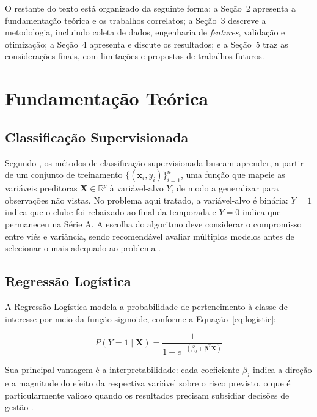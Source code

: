 \documentclass[
    article,
    12pt,
    oneside,
    a4paper,
    english,
    brazilian
    ]{abntex2}
\begin{document}
O restante do texto está organizado da seguinte forma: a Seção~2 apresenta a fundamentação teórica e os trabalhos correlatos; a Seção~3 descreve a metodologia, incluindo coleta de dados, engenharia de \textit{features}, validação e otimização; a Seção~4 apresenta e discute os resultados; e a Seção~5 traz as considerações finais, com limitações e propostas de trabalhos futuros.

\section{Fundamentação Teórica}

\subsection{Classificação Supervisionada}

Segundo , os métodos de classificação supervisionada buscam aprender, a partir de um conjunto de treinamento $\{(\mathbf{x}_i, y_i)\}_{i=1}^n$, uma função que mapeie as variáveis preditoras $\mathbf{X} \in \mathbb{R}^p$ à variável-alvo $Y$, de modo a generalizar para observações não vistas. No problema aqui tratado, a variável-alvo é binária: $Y = 1$ indica que o clube foi rebaixado ao final da temporada e $Y = 0$ indica que permaneceu na Série A. A escolha do algoritmo deve considerar o compromisso entre viés e variância, sendo recomendável avaliar múltiplos modelos antes de selecionar o mais adequado ao problema \cite{james2023}.

\subsection{Regressão Logística}

A Regressão Logística \cite{cox1958} modela a probabilidade de pertencimento à classe de interesse por meio da função sigmoide, conforme a Equação~\ref{eq:logistic}:

\begin{equation}
    P(Y = 1 \mid \mathbf{X}) = \frac{1}{1 + e^{-(\beta_0 + \boldsymbol{\beta}^T \mathbf{X})}}
    \label{eq:logistic}
\end{equation}

Sua principal vantagem é a interpretabilidade: cada coeficiente $\beta_j$ indica a direção e a magnitude do efeito da respectiva variável sobre o risco previsto, o que é particularmente valioso quando os resultados precisam subsidiar decisões de gestão \cite{james2023}.
\end{document}
